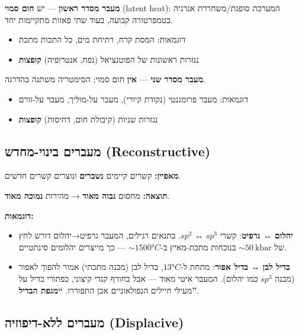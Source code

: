 \documentclass[
  hebrew,
  letterpaper,
  DIV=11,
  numbers=noendperiod]{scrreprt}
\providecommand{\tightlist}{%
  \setlength{\itemsep}{0pt}\setlength{\parskip}{0pt}}
\begin{document}
\textbf{מעבר מסדר ראשון} --- יש \textbf{חום סמוי} (latent heat): המערכת
סופגת/משחררת אנרגיה בטמפרטורה קבועה, בעוד שתי פאזות מתקיימות יחד.

\begin{itemize}
\tightlist
\item
  דוגמאות: המסת קרח, רתיחת מים, כל התכות מתכת
\item
  נגזרות ראשונות של הפוטנציאל (נפח, אנטרופיה) \textbf{קופצות}
\end{itemize}

\textbf{מעבר מסדר שני} --- \textbf{אין} חום סמוי; הסימטריה משתנה בהדרגה.

\begin{itemize}
\tightlist
\item
  דוגמאות: מעבר פרומגנטי (נקודת קיורי), מעבר על-מוליך, מעבר על-זורם
\item
  נגזרות שניות (קיבולת חום, דחיסות) \textbf{קופצות}
\end{itemize}

\subsection{מעברים בינוי-מחדש
(Reconstructive)}\label{ux5deux5e2ux5d1ux5e8ux5d9ux5dd-ux5d1ux5d9ux5e0ux5d5ux5d9-ux5deux5d7ux5d3ux5e9-reconstructive}

\textbf{מאפיין:} קשרים קיימים \textbf{נשברים} ונוצרים קשרים חדשים.

\textbf{תוצאה:} מחסום \textbf{גבוה מאוד} → מהירות \textbf{נמוכה מאוד}.

\textbf{דוגמאות:}

\begin{itemize}
\tightlist
\item
  \textbf{יהלום ↔ גרפיט}: קשרי \(sp^3\) ↔ \(sp^2\). בתנאים רגילים, המעבר
  גרפיט→יהלום דורש לחץ של \(\sim 50\ \text{kbar}\) בנוכחות מתכת-מאיץ
  ב-\(\sim 1500°C\) --- כך מייצרים יהלומים סינתטיים.
\item
  \textbf{בדיל לבן ↔ בדיל אפור}: מתחת ל-\(13°C\), בדיל לבן (מבנה מתכתי)
  אמור להפוך לאפור (מבנה \(sp^3\) כמו יהלום). המעבר איטי מאוד --- אבל
  בחורף קנדי קיצוני, כפתורי בדיל על מעילי חיילים הנפולאוניים אכן
  התפוררו. \textbf{``מגפת הבדיל''}.
\end{itemize}

\subsection{מעברים ללא-דיפוזיה
(Displacive)}\label{ux5deux5e2ux5d1ux5e8ux5d9ux5dd-ux5dcux5dcux5d0-ux5d3ux5d9ux5e4ux5d5ux5d6ux5d9ux5d4-displacive}
\end{document}
